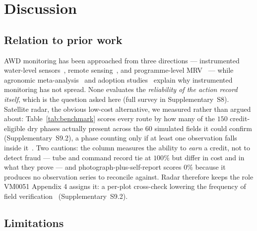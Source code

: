 \section{Discussion}
\label{sec:discussion}

\subsection{Relation to prior work}

AWD monitoring has been approached from three directions --- instrumented
water-level sensors~\cite{delacruz2022}, remote
sensing~\cite{lovell2019,islam2026alose,mlrice2025,narayanan2024}, and programme-level
MRV~\cite{qd1490,mae2026progress,irri2026mrv} --- while agronomic
meta-analysis~\cite{carrijo2017} and adoption
studies~\cite{lampayan2015,enriquez2021} explain why instrumented monitoring
has not spread. None evaluates the \emph{reliability of the action record
itself}, which is the question asked here (full survey in Supplementary~S8). Satellite radar, the obvious low-cost alternative, we
measured rather than argued about: Table~\ref{tab:benchmark} scores every
route by how many of the $150$ credit-eligible dry phases actually present across
the $60$ simulated fields it could confirm (Supplementary~S9.2), a phase counting
only if at least one observation falls inside
it~\cite{clauss2017s1,hashemi2022s1,delacruz2022}. Two cautions: the column
measures the ability to \emph{earn} a credit, not to detect fraud --- tube and
command record tie at $100\%$ but differ in cost and in what they prove ---
and photograph-plus-self-report scores $0\%$ because it produces no
observation series to reconcile against. Radar therefore keeps the
role VM0051 Appendix 4 assigns it: a per-plot cross-check lowering the
frequency of field verification~\cite{vm0051} (Supplementary~S9.2).

\subsection{Limitations}

